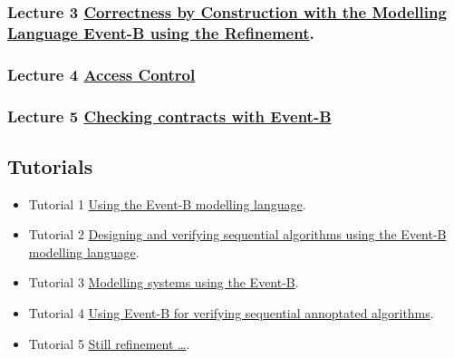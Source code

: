 \documentclass[ 12pt]{article}
\begin{document}
\subsubsection{Lecture 3 
    \href{http://mery54.github.io/teaching/mosos/lecturesnotes/masterillect2.pdf}{Correctness by Construction with the  
      Modelling Language Event-B using the Refinement}.}

  \subsubsection{ Lecture 4 
    \href{http://mery54.github.io/teaching/mosos/lecturesnotes/masterillect3.pdf}{Access 
      Control }}


\subsubsection{ Lecture 5
    \href{http://mery54.github.io/teaching/mosos/lecturesnotes/masterillect-verification.pdf}{Checking contracts with Event-B}}

      
  
\subsection{Tutorials}

  \begin{itemize}
  \item[]   Tutorial 1
    \href{http://mery54.github.io/teaching/mosos/lecturesnotes/master-tutorial1.pdf}{Using 
      the Event-B modelling language}.

     \item[]   Tutorial 2
    \href{http://mery54.github.io/teaching/mosos/lecturesnotes/master-tutorial2.pdf}{
      Designing and verifying sequential algorithms using the Event-B
      modelling language}.

        \item[]   Tutorial 3
    \href{http://mery54.github.io/teaching/mosos/lecturesnotes/master-tutorial3.pdf}{
      Modelling   systems  using the Event-B}.

   \item[]   Tutorial 4
    \href{http://mery54.github.io/teaching/mosos/lecturesnotes/master-tutorial4.pdf}{
      Using  Event-B  for  verifying sequential  annoptated algorithms}.


  
   \item[]   Tutorial 5
    \href{http://mery54.github.io/teaching/mosos/lecturesnotes/master-tutorial5.pdf}{
      Still refinement \ldots}.

  
    
  \end{itemize}
\end{document}
